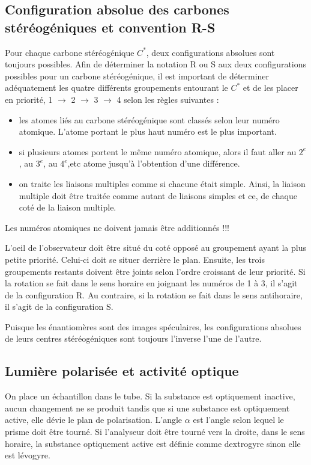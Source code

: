 \subsection{Configuration absolue des carbones stéréogéniques et convention R-S} Pour chaque carbone stéréogénique $C^*$, deux configurations absolues sont toujours possibles.
Afin de déterminer la notation R ou S aux deux configurations possibles pour un carbone stéréogénique, il est important de déterminer adéquatement les quatre différents groupements entourant le $C^*$ et de les placer en priorité, 1 $\rightarrow$  2 $\rightarrow$ 3 $\rightarrow$ 4 selon les règles suivantes :
\begin{itemize}
  \item les atomes liés au carbone stéréogénique sont classés selon leur numéro atomique.
    L'atome portant le plus haut numéro est le plus important.
  \item si plusieurs atomes portent le même numéro atomique, alors il faut aller au $2^e$, au $3^e$, au $4^e$,etc atome jusqu'à l'obtention d'une différence.
  \item on traite les liaisons multiples comme si chacune était simple.
    Ainsi, la liaison multiple doit être traitée comme autant de liaisons simples et ce, de chaque coté de la liaison multiple.

\end{itemize}


Les numéros atomiques ne doivent jamais être additionnés !!!

L'oeil de l'observateur doit être situé du coté opposé au groupement ayant la plus petite priorité.
Celui-ci doit se situer derrière le plan.
Ensuite, les trois groupements restants doivent être joints selon l'ordre croissant de leur priorité.
Si la rotation se fait dans le sens horaire en joignant les numéros de 1 à 3, il s'agit de la configuration R.
Au contraire, si la rotation se fait dans le sens antihoraire, il s'agit de la configuration S.

Puisque les énantiomères sont des images spéculaires, les configurations absolues de leurs centres stéréogéniques sont toujours l'inverse l'une de l'autre.

\subsection{Lumière polarisée et activité optique}On place un échantillon dans le tube.
Si la substance est optiquement inactive, aucun changement ne se produit tandis que si une substance est optiquement active, elle dévie le plan de polarisation.
L'angle $\alpha$ est l'angle selon lequel le prisme doit être tourné.
Si l'analyseur doit être tourné vers la droite, dans le sens horaire, la substance optiquement active est définie comme dextrogyre sinon elle est lévogyre.

